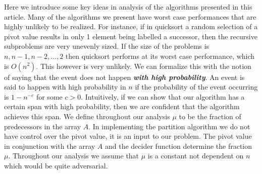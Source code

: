 \documentclass[twocolumn, twoside, 12pt]{article}
\newcommand{\defn}[1]       {{\textit{\textbf{\boldmath #1}}}}
\renewcommand{\paragraph}[1]{\vspace{0.09in}\noindent{\bf \boldmath #1.}}
\begin{document}
\paragraph{Further Preliminaries}
Here we introduce some key ideas in analysis of the algorithms presented in this article.
Many of the algorithms we present have worst case performances that are highly unlikely to be realized.
For instance, if in quicksort a random selection of a pivot value results in only 1 element being labelled a successor, then the recursive subproblems are very unevenly sized.
If the size of the problems is $n, n-1, n-2,\ldots,2$ then quicksort performs at its worst case performance, which is $O(n^2)$.
This however is very unlikely.
We can formalize this with the notion of saying that the event does not happen \defn{with high probability}.
An event is said to happen with high probability in $n$ if the probability of the event occurring is $1-n^{-c}$ for some $c>0$.
Intuitively, if we can show that our algorithm has a certain span with high probability, then we are confident that the algorithm achieves this span.
We define throughout our analysis $\mu$ to be the fraction of predecessors in the array $A$.
In implementing the partition algorithm we do not have control over the pivot value, it is an input to our problem.
The pivot value in conjunction with the array $A$ and the decider function determine the fraction $\mu$.
Throughout our analysis we assume that $\mu$ is a constant not dependent on $n$ which would be quite adversarial.
\end{document}
